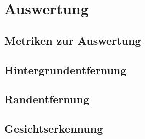 \chapter{Auswertung}

\section{Metriken zur Auswertung}

\section{Hintergrundentfernung}

\section{Randentfernung}

\section{Gesichtserkennung}

